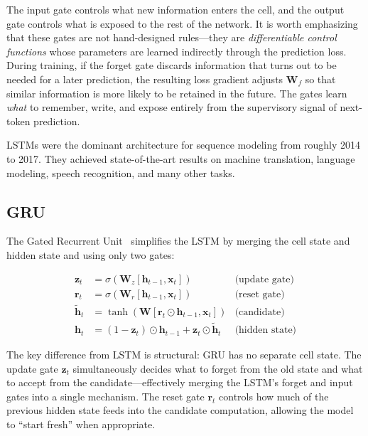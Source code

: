 \medskip
\noindent{}
\medskip The input gate controls what new information enters the cell, and the output gate controls what is exposed to the rest of the network. It is worth emphasizing that these gates are not hand-designed rules---they are \emph{differentiable control functions} whose parameters are learned indirectly through the prediction loss. During training, if the forget gate discards information that turns out to be needed for a later prediction, the resulting loss gradient adjusts $\mathbf{W}_f$ so that similar information is more likely to be retained in the future. The gates learn \emph{what} to remember, write, and expose entirely from the supervisory signal of next-token prediction.

LSTMs were the dominant architecture for sequence modeling from roughly 2014 to 2017. They achieved state-of-the-art results on machine translation, language modeling, speech recognition, and many other tasks.

\subsection{GRU}

The Gated Recurrent Unit~\cite{cho2014learning} simplifies the LSTM by merging the cell state and hidden state and using only two gates:

\begin{align}
\mathbf{z}_t &= \sigma(\mathbf{W}_z [\mathbf{h}_{t-1}, \mathbf{x}_t]) & \text{(update gate)} \\
\mathbf{r}_t &= \sigma(\mathbf{W}_r [\mathbf{h}_{t-1}, \mathbf{x}_t]) & \text{(reset gate)} \\
\tilde{\mathbf{h}}_t &= \tanh(\mathbf{W} [\mathbf{r}_t \odot \mathbf{h}_{t-1}, \mathbf{x}_t]) & \text{(candidate)} \\
\mathbf{h}_t &= (1 - \mathbf{z}_t) \odot \mathbf{h}_{t-1} + \mathbf{z}_t \odot \tilde{\mathbf{h}}_t & \text{(hidden state)}
\end{align}

The key difference from LSTM is structural: GRU has no separate cell state. The update gate $\mathbf{z}_t$ simultaneously decides what to forget from the old state and what to accept from the candidate---effectively merging the LSTM's forget and input gates into a single mechanism. The reset gate $\mathbf{r}_t$ controls how much of the previous hidden state feeds into the candidate computation, allowing the model to ``start fresh'' when appropriate.

